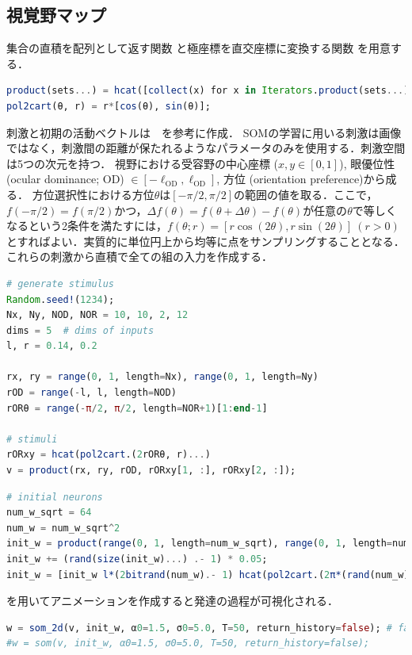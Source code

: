 \subsection{視覚野マップ}
集合の直積を配列として返す関数 と極座標を直交座標に変換する関数 を用意する．
\begin{lstlisting}[language=julia]
product(sets...) = hcat([collect(x) for x in Iterators.product(sets...)]...)' # Array of Cartesian product of sets 
pol2cart(θ, r) = r*[cos(θ), sin(θ)];
\end{lstlisting}
刺激と初期の活動ベクトルは\citep{Carreira-Perpinan2005-gy}　を参考に作成．
SOMの学習に用いる刺激は画像ではなく，刺激間の距離が保たれるようなパラメータのみを使用する．刺激空間は5つの次元を持つ．
視野における受容野の中心座標 ($x, y \in [0, 1]$), 眼優位性 (ocular dominance; OD) $\in [-\ell_\textrm{OD}, \ell_\textrm{OD}]$, 方位 (orientation preference)から成る． 方位選択性における方位$\theta$は$[-\pi/2, \pi/2]$の範囲の値を取る．ここで，$f(-\pi/2)=f(\pi/2)$かつ，$\Delta f(\theta) = f(\theta+\Delta \theta)-f(\theta)$が任意の$\theta$で等しくなるという2条件を満たすには，$f(\theta; r)=[r\cos(2\theta), r\sin(2\theta)]\ (r>0)$とすればよい．実質的に単位円上から均等に点をサンプリングすることとなる．これらの刺激から直積で全ての組の入力を作成する．
\begin{lstlisting}[language=julia]
# generate stimulus
Random.seed!(1234);
Nx, Ny, NOD, NOR = 10, 10, 2, 12
dims = 5  # dims of inputs 
l, r = 0.14, 0.2

rx, ry = range(0, 1, length=Nx), range(0, 1, length=Ny)
rOD = range(-l, l, length=NOD)
rORθ = range(-π/2, π/2, length=NOR+1)[1:end-1]

# stimuli
rORxy = hcat(pol2cart.(2rORθ, r)...)
v = product(rx, ry, rOD, rORxy[1, :], rORxy[2, :]);
\end{lstlisting}
\begin{lstlisting}[language=julia]
# initial neurons
num_w_sqrt = 64
num_w = num_w_sqrt^2
init_w = product(range(0, 1, length=num_w_sqrt), range(0, 1, length=num_w_sqrt))
init_w += (rand(size(init_w)...) .- 1) * 0.05;
init_w = [init_w l*(2bitrand(num_w).- 1) hcat(pol2cart.(2π*(rand(num_w) .- 0.5), r)...)'];
\end{lstlisting}
 を用いてアニメーションを作成すると発達の過程が可視化される．
\begin{lstlisting}[language=julia]
w = som_2d(v, init_w, α0=1.5, σ0=5.0, T=50, return_history=false); # faster
#w = som(v, init_w, α0=1.5, σ0=5.0, T=50, return_history=false);
\end{lstlisting}
